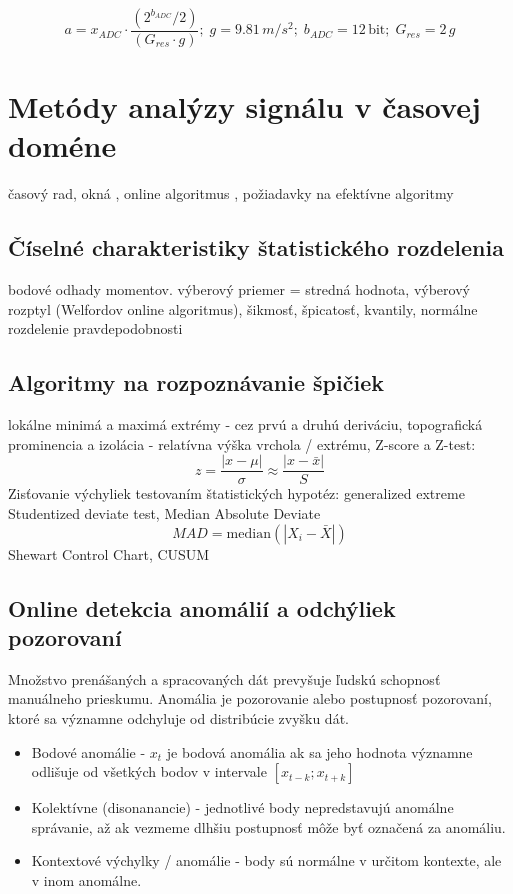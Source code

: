 \begin{equation}
a = x_{ADC} \cdot \frac{(2^{b_{ADC}} / 2)}{(G_{res} \cdot g)};\; g = 9.81\,m/s^2;\; b_{ADC} = 12\,\mathrm{bit};\; G_{res} = 2\,g
\end{equation}

\section{Metódy analýzy signálu v časovej doméne}
časový rad, okná
\cite{time-series-analysis} \cite{practical-time-series} \cite{generalized-esd} \cite{twitter-esd}, 
online algoritmus \cite{online-anomaly-detection}, 
požiadavky na efektívne algoritmy
	

\subsection{Číselné charakteristiky štatistického rozdelenia}
bodové odhady momentov. výberový priemer = stredná hodnota, výberový rozptyl (Welfordov online algoritmus), šikmosť, špicatosť, kvantily, normálne rozdelenie pravdepodobnosti

\subsection{Algoritmy na rozpoznávanie špičiek}
lokálne minimá a maximá extrémy - cez prvú a druhú deriváciu,
topografická prominencia a izolácia - relatívna výška vrchola / extrému, 
Z-score a Z-test: 
\begin{equation}
z = \frac{|x - \mu|}{\sigma} \approx \frac{|x - \bar{x}|}{S}
\end{equation}
Zisťovanie výchyliek testovaním štatistických hypotéz: generalized extreme Studentized deviate test, 
Median Absolute Deviate
\begin{equation}
MAD = \mathrm{median}(|X_i - \bar{X}|)
\end{equation}
Shewart Control Chart, CUSUM \cite{change-theory}
	 
\subsection{Online detekcia anomálií a odchýliek pozorovaní}
\cite{survey-univariate-time-series} 
Množstvo prenášaných a spracovaných dát prevyšuje ľudskú schopnosť manuálneho prieskumu. Anomália je pozorovanie alebo postupnosť pozorovaní, ktoré sa významne odchyluje od distribúcie zvyšku dát. 
\begin{itemize}
	\item Bodové anomálie - $x_t$ je bodová anomália ak sa jeho hodnota významne odlišuje od všetkých 		
		bodov v intervale $ [x_{t-k}; x_{t+k}] $
	\item Kolektívne (disonanancie) - jednotlivé body nepredstavujú anomálne správanie, až ak vezmeme dlhšiu postupnosť môže byť označená za anomáliu.
	\item Kontextové výchylky / anomálie - body sú normálne v určitom kontexte, ale v inom anomálne.
\end{itemize}		

